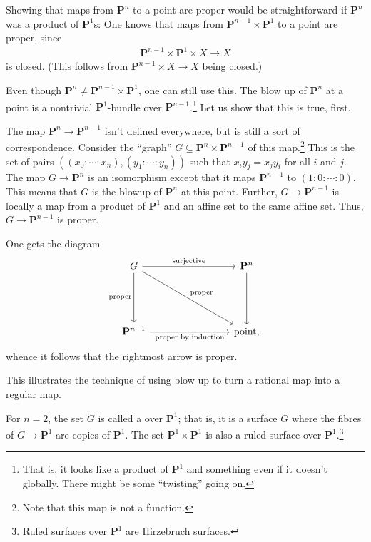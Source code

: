 \documentclass[11pt, oneside,margin=1in]{article}
\begin{document}
Showing that maps from $\mathbf{P}^n$ to a point are proper would be straightforward if $\mathbf{P}^n$ was a product of $\mathbf{P}^1$s: One knows that maps from $\mathbf{P}^{n-1}\times \mathbf{P}^1$ to a point are proper, since
\begin{align*}
	\mathbf{P}^{n-1} \times \mathbf{P}^1\times X\longrightarrow X
\end{align*}
is closed. (This follows from $\mathbf{P}^{n-1}\times X\longrightarrow X$ being closed.) 

Even though $\mathbf{P}^n\ne \mathbf{P}^{n-1}\times \mathbf{P}^1$, one can still use this. The blow up of $\mathbf{P}^n$ at a point is a nontrivial $\mathbf{P}^1$-bundle over $\mathbf{P}^{n-1}$.\footnote{That is, it looks like a product of $\mathbf{P}^1$ and something even if it doesn't globally. There might be some ``twisting'' going on.} Let us show that this is true, first.

The map $\mathbf{P}^{n}\longrightarrow \mathbf{P}^{n-1}$ isn't defined everywhere, but is still a sort of correspondence. Consider the ``graph'' $G\subseteq \mathbf{P}^n\times \mathbf{P}^{n-1}$ of this map.\footnote{Note that this map is not a function.} This is the set of pairs $((x_0:\cdots:x_n), (y_1:\cdots:y_n))$ such that $x_iy_j=x_jy_i$ for all $i$ and $j$. The map $G\longrightarrow \mathbf{P}^n$ is an isomorphism except that it maps $\mathbf{P}^{n-1}$ to $(1:0:\cdots:0)$. This means that $G$ is the blowup of $\mathbf{P}^n$ at this point. Further, $G\longrightarrow \mathbf{P}^{n-1}$ is locally a map from a product of $\mathbf{P}^1$ and an affine set to the same affine set. Thus, $G\longrightarrow \mathbf{P}^{n-1}$ is proper.

One gets the diagram
\[
\begin{tikzcd}[column sep = 8 em, row sep = 5 em]
	G \ar[r, "\textrm{surjective}" \iffalse twoheadrightarrow\fi] \ar[d,swap,"\textrm{proper}"] \ar[dr, "\textrm{proper}"] & \mathbf{P}^n\ar[d]\\
	\mathbf{P}^{n-1}\ar[r,"\textrm{proper }\\ \textrm{by induction}", swap] &\textrm{point,}
\end{tikzcd}
\]
whence it follows that the rightmost arrow is proper.

\begin{remark}
	This illustrates the technique of using blow up to turn a rational map into a regular map.
\end{remark}

\begin{remark}
	For $n=2$, the set $G$ is called a  over $\mathbf{P}^1$; that is, it is a surface $G$ where the fibres of $G\longrightarrow \mathbf{P}^1$ are copies of $\mathbf{P}^1$. The set $\mathbf{P}^1\times \mathbf{P}^1$ is also a ruled surface over $\mathbf{P}^1$.\footnote{Ruled surfaces over $\mathbf{P}^1$ are Hirzebruch surfaces.}
\end{remark}
\end{document}
